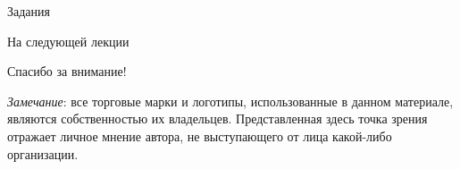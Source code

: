 \begin{frame}{Задания}
\end{frame}

\begin{frame}{На следующей лекции}
\end{frame}

\begin{frame}

{\huge{Спасибо за внимание!}\par}

\vfill

\tiny{\textit{Замечание}: все торговые марки и логотипы, использованные в данном материале, являются собственностью их владельцев. Представленная здесь точка зрения отражает личное мнение автора, не выступающего от лица какой-либо организации.}

\end{frame}


